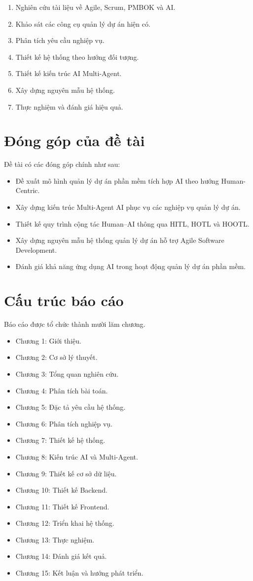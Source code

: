 \documentclass[12pt,a4paper]{report}
\begin{document}
\begin{enumerate}
\item Nghiên cứu tài liệu về Agile, Scrum, PMBOK và AI.
\item Khảo sát các công cụ quản lý dự án hiện có.
\item Phân tích yêu cầu nghiệp vụ.
\item Thiết kế hệ thống theo hướng đối tượng.
\item Thiết kế kiến trúc AI Multi-Agent.
\item Xây dựng nguyên mẫu hệ thống.
\item Thực nghiệm và đánh giá hiệu quả.
\end{enumerate}

\section{Đóng góp của đề tài}

Đề tài có các đóng góp chính như sau:

\begin{itemize}
\item Đề xuất mô hình quản lý dự án phần mềm tích hợp AI theo hướng Human-Centric.
\item Xây dựng kiến trúc Multi-Agent AI phục vụ các nghiệp vụ quản lý dự án.
\item Thiết kế quy trình cộng tác Human--AI thông qua HITL, HOTL và HOOTL.
\item Xây dựng nguyên mẫu hệ thống quản lý dự án hỗ trợ Agile Software Development.
\item Đánh giá khả năng ứng dụng AI trong hoạt động quản lý dự án phần mềm.
\end{itemize}

\section{Cấu trúc báo cáo}
Báo cáo được tổ chức thành mười lăm chương.

\begin{itemize}
\item Chương 1: Giới thiệu.
\item Chương 2: Cơ sở lý thuyết.
\item Chương 3: Tổng quan nghiên cứu.
\item Chương 4: Phân tích bài toán.
\item Chương 5: Đặc tả yêu cầu hệ thống.
\item Chương 6: Phân tích nghiệp vụ.
\item Chương 7: Thiết kế hệ thống.
\item Chương 8: Kiến trúc AI và Multi-Agent.
\item Chương 9: Thiết kế cơ sở dữ liệu.
\item Chương 10: Thiết kế Backend.
\item Chương 11: Thiết kế Frontend.
\item Chương 12: Triển khai hệ thống.
\item Chương 13: Thực nghiệm.
\item Chương 14: Đánh giá kết quả.
\item Chương 15: Kết luận và hướng phát triển.
\end{itemize}
\end{document}
